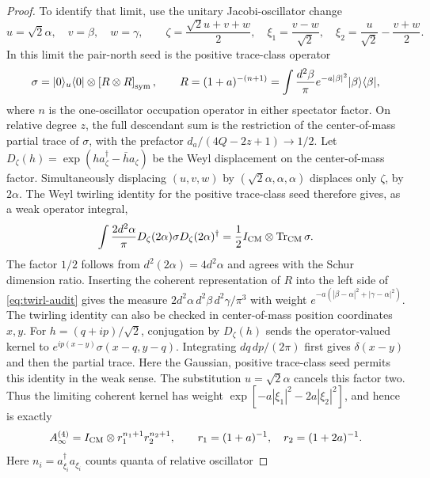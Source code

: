 \documentclass[11pt]{article}
\begin{document}
\begin{proof}
To identify that limit, use the unitary Jacobi-oscillator change
\begin{equation}
 u=\sqrt2\alpha,\quad v=\beta,\quad w=\gamma,\qquad
 \zeta=\frac{\sqrt2u+v+w}{2},\quad
 \xi_1=\frac{v-w}{\sqrt2},\quad
 \xi_2=\frac{u}{\sqrt2}-\frac{v+w}{2}.
\end{equation}
In this limit the pair-north seed is the positive trace-class operator
\begin{equation}
 \sigma=|0\rangle_u\langle0|\otimes
 \left[R\otimes R\right]_{\rm sym},\qquad
 R=(1+a)^{-(n+1)}
   =\int\frac{d^2\beta}{\pi}e^{-a|\beta|^2}|\beta\rangle\langle\beta|,
\end{equation}
where $n$ is the one-oscillator occupation operator in either spectator
factor. On relative degree $z$, the full descendant sum is the restriction
of the center-of-mass partial trace of $\sigma$, with the prefactor
$d_a/(4Q-2z+1)\to1/2$.
Let $D_\zeta(h)=\exp(h a_\zeta^\dagger-\bar h a_\zeta)$ be
the Weyl displacement on the center-of-mass factor. Simultaneously
displacing $(u,v,w)$ by $(\sqrt2\alpha,\alpha,\alpha)$ displaces only
$\zeta$, by $2\alpha$. The Weyl twirling identity for the positive
trace-class seed therefore gives, as a weak operator integral,
\begin{equation}\label{eq:twirl-audit}
 \int\frac{2d^2\alpha}{\pi}
 D_\zeta(2\alpha)\sigma D_\zeta(2\alpha)^\dagger
 =\frac12 I_{\rm CM}\otimes\operatorname{Tr}_{\rm CM}\sigma.
\end{equation}
The factor $1/2$ follows from $d^2(2\alpha)=4d^2\alpha$ and agrees with
the Schur dimension ratio. Inserting the coherent representation of $R$
into the left side of \eqref{eq:twirl-audit} gives the measure
$2d^2\alpha\,d^2\beta\,d^2\gamma/\pi^3$ with weight
$e^{-a(|\beta-\alpha|^2+|\gamma-\alpha|^2)}$.
The twirling identity can also be checked in center-of-mass position
coordinates $x,y$. For $h=(q+ip)/\sqrt2$, conjugation by $D_\zeta(h)$
sends the operator-valued kernel to
$e^{ip(x-y)}\sigma(x-q,y-q)$. Integrating $dq\,dp/(2\pi)$ first gives
$\delta(x-y)$ and then the partial trace. Here the Gaussian, positive
trace-class seed permits this identity in the weak sense.
The substitution $u=\sqrt2\alpha$ cancels this factor two. Thus the
limiting coherent kernel has weight
$\exp[-a|\xi_1|^2-2a|\xi_2|^2]$, and hence is exactly
\begin{equation}
 A^{(4)}_{\infty}=I_{\rm CM}\otimes r_1^{n_1+1}r_2^{n_2+1},\qquad
 r_1=(1+a)^{-1},\quad r_2=(1+2a)^{-1}.
\end{equation}
Here $n_i=a_{\xi_i}^\dagger a_{\xi_i}$ counts quanta of relative oscillator

\end{proof}
\end{document}
